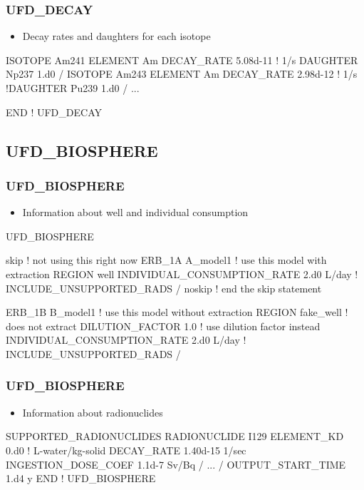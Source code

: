 \documentclass{beamer}
\newcommand\redcomment[1]{{{\color{red} #1}}}
\newcommand\bluecomment[1]{{{\color{blue} #1}}}
\begin{document}
\begin{frame}[fragile]\frametitle{UFD\_DECAY}

\begin{itemize}
  \item \redcomment{Decay rates} and \redcomment{daughters} for each isotope
\end{itemize}

\begin{semiverbatim}\small
  ISOTOPE Am241
    ELEMENT Am
    DECAY_RATE 5.08d-11 \bluecomment{! 1/s}
    DAUGHTER Np237 1.d0
  /
  ISOTOPE Am243
    ELEMENT Am
    DECAY_RATE 2.98d-12 \bluecomment{! 1/s}
    \bluecomment{!DAUGHTER Pu239 1.d0}
  /
\bluecomment{...}

END \bluecomment{! UFD_DECAY}
\end{semiverbatim}
\end{frame}

\subsection{UFD\_BIOSPHERE}
\begin{frame}[fragile]\frametitle{UFD\_BIOSPHERE}

\begin{itemize}
  \item Information about well and individual consumption
\end{itemize}

\begin{semiverbatim}\small
UFD_BIOSPHERE

skip \bluecomment{! not using this right now}
  ERB_1A A_model1 \bluecomment{! use this model with extraction}
    REGION well
    INDIVIDUAL_CONSUMPTION_RATE 2.d0 L/day
    \bluecomment{! INCLUDE_UNSUPPORTED_RADS}
  /
noskip \bluecomment{! end the skip statement}

  ERB_1B B_model1 \bluecomment{! use this model without extraction}
    REGION fake_well \bluecomment{! does not extract}
    DILUTION_FACTOR 1.0 \bluecomment{! use dilution factor instead}
    INDIVIDUAL_CONSUMPTION_RATE 2.d0 L/day
    \bluecomment{! INCLUDE_UNSUPPORTED_RADS}
  /

\end{semiverbatim}
\end{frame}

\begin{frame}[fragile]\frametitle{UFD\_BIOSPHERE}

\begin{itemize}
  \item Information about radionuclides
\end{itemize}

\begin{semiverbatim}\small
  SUPPORTED_RADIONUCLIDES
    RADIONUCLIDE I129
      ELEMENT_KD 0.d0  \bluecomment{! L-water/kg-solid}
      DECAY_RATE 1.40d-15 1/sec
      INGESTION_DOSE_COEF 1.1d-7 Sv/Bq
    /
    \bluecomment{...}
  /
  OUTPUT_START_TIME 1.d4 y
END \bluecomment{! UFD_BIOSPHERE}
\end{semiverbatim}
\end{frame}
\end{document}
